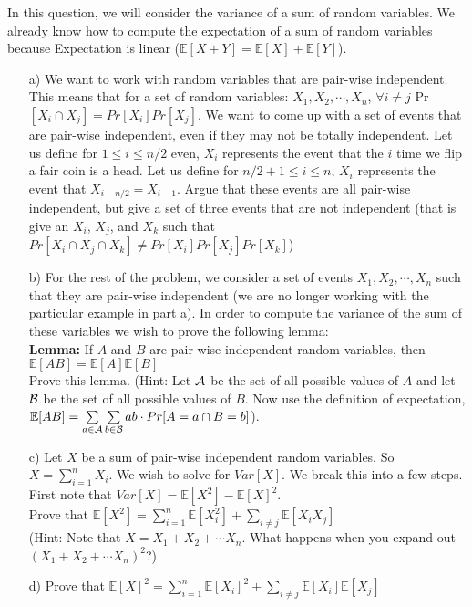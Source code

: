 \documentclass[]{article}
\def \exx {\mathbb{E}}
\begin{document}
\begin{qunlist}
In this question, we will consider the variance of a sum of random variables. We already know how to compute the expectation of a sum of random variables because Expectation is linear ($\mathbb{E}[X+Y] = \mathbb{E}[X] + \mathbb{E}[Y]$).
\begin{enumerate}
\qpart
\item[a)] We want to work with random variables that are pair-wise independent. This means that for a set of random variables: $X_1, X_2, \cdots, X_n$, $\forall{i \neq} j $ Pr$[X_i \cap X_j] = Pr[X_i]Pr[X_j]$. We want to come up with a set of events that are pair-wise independent, even if they may not be totally independent. Let us define for $1 \leq i \leq n/2$ even, $X_i$ represents the event that the $i$ time we flip a fair coin is a head. Let us define for $n/2 + 1 \leq i \leq n$, $X_i$ represents the event that $X_{i-n/2} = X_{i-1}$. Argue that these events are all pair-wise independent, but give a set of three events that are not independent (that is give an $X_i$, $X_j$, and $X_k$ such that $Pr[X_i \cap X_j \cap X_k] \neq Pr[X_i]Pr[X_j]Pr[X_k]$)
\qpart
\item[b)] For the rest of the problem, we consider a set of events $X_1, X_2, \cdots, X_n$ such that they are pair-wise independent (we are no longer working with the particular example in part a). In order to compute the variance of the sum of these variables we wish to prove the following lemma: \\ \textbf{Lemma:} If $A$ and $B$ are pair-wise independent random variables, then $\exx[AB] = \exx[A] \exx[B]$ \\ Prove this lemma. (Hint: Let ${\cal A}$ be the set of all possible values of $A$ and let ${\cal B}$ be the set of all possible values of $B$. Now use the definition of expectation, $\exx[AB] = \sum\limits_{a \in \Aset} \sum\limits_{b \in \Bset} ab \cdot Pr[A=a \cap B = b]$).
\qpart
\item[c)] Let $X$ be a sum of pair-wise independent random variables. So $X = \sum\nolimits_{i=1}^n X_i$. We wish to solve for $Var[X]$. We break this into a few steps. First note that $Var[X] = \exx[X^2] - \exx[X]^2$. \\ Prove that $\exx[X^2] = \sum\nolimits_{i=1}^n \exx[X_i^2] + \sum\limits_{i \neq j} \exx[X_iX_j]$ \\ (Hint: Note that $X = X_1 + X_2 + \cdots X_n$. What happens when you expand out $(X_1 + X_2 + \cdots X_n)^2$?)
\qpart
\item[d)] Prove that $\exx[X]^2 = \sum\nolimits_{i=1}^n \exx[X_i]^2 + \sum\limits_{i \neq j} \exx[X_i] \exx[X_j]$

\end{enumerate}
\end{qunlist}
\end{document}
